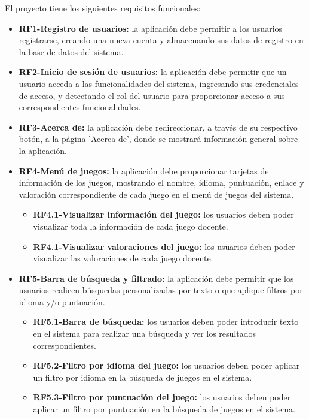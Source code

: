 El proyecto tiene los siguientes requisitos funcionales:
\begin{itemize}
\tightlist
    \item \textbf{RF1-Registro de usuarios:} la aplicación debe permitir a los usuarios registrarse, creando una nueva cuenta y almacenando sus datos de registro en la base de datos del sistema.
    \item \textbf{RF2-Inicio de sesión de usuarios:} la aplicación debe permitir que un usuario acceda a las funcionalidades del sistema, ingresando sus credenciales de acceso, y detectando el rol del usuario para proporcionar acceso a sus correspondientes funcionalidades.
    \item \textbf{RF3-Acerca de:} la aplicación debe redireccionar, a través de su respectivo botón, a la página 'Acerca de', donde se mostrará información general sobre la aplicación.
    \item \textbf{RF4-Menú de juegos:} la aplicación debe proporcionar tarjetas de información de los juegos, mostrando el nombre, idioma, puntuación, enlace y valoración correspondiente de cada juego en el menú de juegos del sistema.
        \begin{itemize}
        \tightlist
            \item \textbf{RF4.1-Visualizar información del juego:} los usuarios deben poder visualizar toda la información de cada juego docente.
            \item \textbf{RF4.1-Visualizar valoraciones del juego:} los usuarios deben poder visualizar las valoraciones de cada juego docente.
        \end{itemize}
     \item \textbf{RF5-Barra de búsqueda y filtrado:} la aplicación debe permitir que los usuarios realicen búsquedas personalizadas por texto o que aplique filtros por idioma y/o puntuación.
        \begin{itemize}
        \tightlist
            \item \textbf{RF5.1-Barra de búsqueda:} los usuarios deben poder introducir texto en el sistema para realizar una búsqueda y ver los resultados correspondientes.
            \item \textbf{RF5.2-Filtro por idioma del juego:} los usuarios deben poder aplicar un filtro por idioma en la búsqueda de juegos en el sistema.
            \item\textbf{RF5.3-Filtro por puntuación del juego:} los usuarios deben poder aplicar un filtro por puntuación en la búsqueda de juegos en el sistema.

\end{itemize}
\end{itemize}
